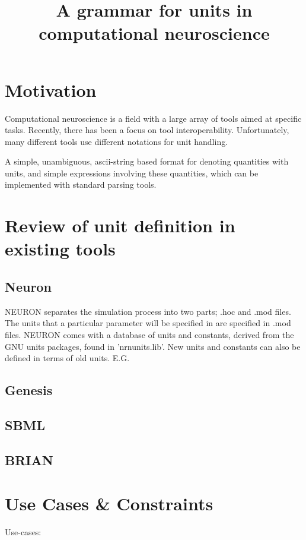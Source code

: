 \documentclass{article}
\title{A grammar for units in computational neuroscience}
\begin{document}
\maketitle

\section*{Motivation}

Computational neuroscience is a field with a large 
array of tools aimed at specific tasks. Recently, 
there has been a focus on tool interoperability. 
Unfortunately, many different tools use different 
notations for unit handling. 

A simple, unambiguous, ascii-string based format for denoting quantities with units, and 
simple expressions involving these quantities, which can be implemented with standard parsing tools. 


\section*{Review  of unit definition in existing tools}

\subsection*{Neuron}
NEURON separates the simulation process into two parts; .hoc and .mod files. The units that a particular parameter will be specified in are specified in .mod files. NEURON comes with a database of units and constants, derived from the GNU units packages, found in 'nrnunits.lib'. New units and constants can also be defined in terms of old units. E.G.
\subsection*{Genesis}
\subsection*{SBML}
\subsection*{BRIAN}



\section*{Use Cases \& Constraints}
Use-cases:
\end{document}
